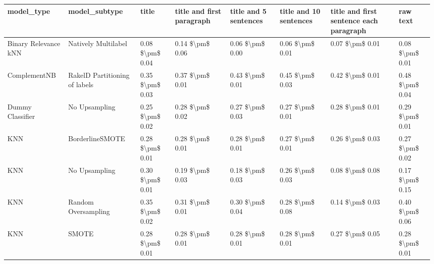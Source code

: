 \begin{tabular}{llllllll}
\toprule
                     model\_type &                 model\_subtype &           title & title and first paragraph & title and 5 sentences & title and 10 sentences & title and first sentence each paragraph &            raw text \\
\midrule
           Binary Relevance kNN &           Natively Multilabel & 0.08 \$\textbackslash pm\$ 0.04 &           0.14 \$\textbackslash pm\$ 0.06 &       0.06 \$\textbackslash pm\$ 0.00 &        0.06 \$\textbackslash pm\$ 0.01 &                         0.07 \$\textbackslash pm\$ 0.01 &     0.08 \$\textbackslash pm\$ 0.01 \\
                   ComplementNB & RakelD Partitioning of labels & 0.35 \$\textbackslash pm\$ 0.03 &           0.37 \$\textbackslash pm\$ 0.01 &       0.43 \$\textbackslash pm\$ 0.01 &        0.45 \$\textbackslash pm\$ 0.03 &                         0.42 \$\textbackslash pm\$ 0.01 &     0.48 \$\textbackslash pm\$ 0.04 \\
               Dummy Classifier &                 No Upsampling & 0.25 \$\textbackslash pm\$ 0.02 &           0.28 \$\textbackslash pm\$ 0.02 &       0.27 \$\textbackslash pm\$ 0.03 &        0.27 \$\textbackslash pm\$ 0.01 &                         0.28 \$\textbackslash pm\$ 0.01 &     0.29 \$\textbackslash pm\$ 0.01 \\
                            KNN &               BorderlineSMOTE & 0.28 \$\textbackslash pm\$ 0.01 &           0.28 \$\textbackslash pm\$ 0.01 &       0.28 \$\textbackslash pm\$ 0.01 &        0.27 \$\textbackslash pm\$ 0.01 &                         0.26 \$\textbackslash pm\$ 0.03 &     0.27 \$\textbackslash pm\$ 0.02 \\
                            KNN &                 No Upsampling & 0.30 \$\textbackslash pm\$ 0.01 &           0.19 \$\textbackslash pm\$ 0.03 &       0.18 \$\textbackslash pm\$ 0.03 &        0.26 \$\textbackslash pm\$ 0.03 &                         0.08 \$\textbackslash pm\$ 0.08 &     0.17 \$\textbackslash pm\$ 0.15 \\
                            KNN &           Random Oversampling & 0.35 \$\textbackslash pm\$ 0.02 &           0.31 \$\textbackslash pm\$ 0.01 &       0.30 \$\textbackslash pm\$ 0.04 &        0.28 \$\textbackslash pm\$ 0.08 &                         0.14 \$\textbackslash pm\$ 0.03 &     0.40 \$\textbackslash pm\$ 0.06 \\
                            KNN &                         SMOTE & 0.28 \$\textbackslash pm\$ 0.01 &           0.28 \$\textbackslash pm\$ 0.01 &       0.28 \$\textbackslash pm\$ 0.01 &        0.28 \$\textbackslash pm\$ 0.01 &                         0.27 \$\textbackslash pm\$ 0.05 &     0.28 \$\textbackslash pm\$ 0.01 \\

\end{tabular}
